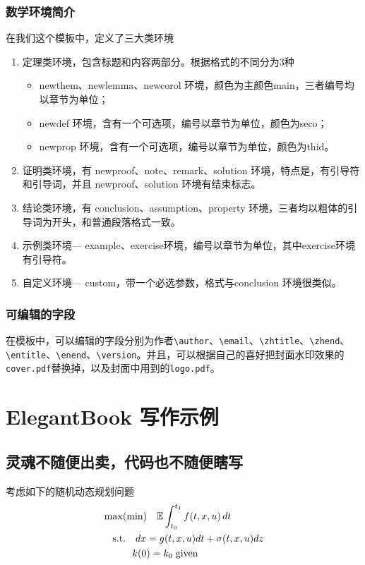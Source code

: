 \documentclass[color=green,mathpazo,titlestyle=hang]{elegantbook}
\begin{document}
\subsection{数学环境简介}
在我们这个模板中，定义了三大类环境
\begin{enumerate}
\item 定理类环境，包含标题和内容两部分。根据格式的不同分为3种
\begin{itemize}
\item {\color{main} newthem、newlemma、newcorol} 环境，颜色为主颜色main，三者编号均以章节为单位；
\item {\color{main} newdef} 环境，含有一个可选项，编号以章节为单位，颜色为seco；
\item {\color{main} newprop} 环境，含有一个可选项，编号以章节为单位，颜色为thid。
\end{itemize}
\item 证明类环境，有  {\color{main} newproof、note、remark、solution} 环境，特点是，有引导符和引导词，并且 newproof、solution 环境有结束标志。
\item 结论类环境，有 {\color{main}  conclusion、assumption、property} 环境，三者均以粗体的引导词为开头，和普通段落格式一致。
\item 示例类环境--- {\color{main} example、exercise}环境，编号以章节为单位，其中exercise环境有引导符。
\item 自定义环境--- {\color{main} custom}，带一个必选参数，格式与conclusion 环境很类似。
\end{enumerate}

\subsection{可编辑的字段}
在模板中，可以编辑的字段分别为作者\verb|\author|、\verb|\email|、\verb|\zhtitle|、\verb|\zhend|、\verb|\entitle|、\verb|\enend|、\verb|\version|。并且，可以根据自己的喜好把封面水印效果的\verb|cover.pdf|替换掉，以及封面中用到的\verb|logo.pdf|。

\chapter{ElegantBook 写作示例}

\section{灵魂不随便出卖，代码也不随便瞎写}
\lipsum[3]
考虑如下的随机动态规划问题
\begin{align*}
&\max(\min)\quad \mathbb{E}\int_{t_0}^{t_1}f(t,x,u)\,dt\\
&\quad\mbox{s.t.} \quad dx=g(t,x,u)dt+\sigma(t,x,u)dz\\
&\quad \hspace{2.em} k(0)=k_0\;\text{given}
\end{align*}
\end{document}
